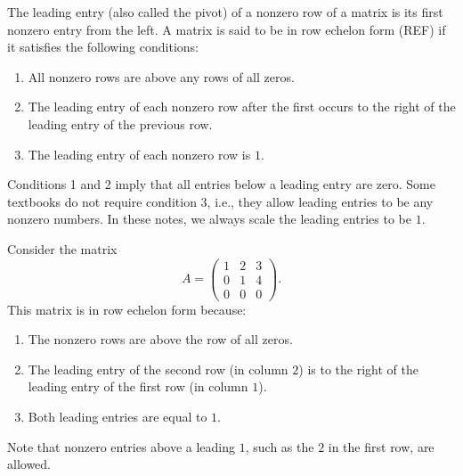\begin{definition}
    The leading entry (also called the pivot) of a nonzero row of a matrix is its first nonzero entry from the left. A matrix is said to be in row echelon form (REF) if it satisfies the following conditions:
    \begin{enumerate}
        \item All nonzero rows are above any rows of all zeros.
        \item The leading entry of each nonzero row after the first occurs to the right of the leading entry of the previous row.
        \item The leading entry of each nonzero row is $1$.
    \end{enumerate}
\end{definition}

\begin{remark}
    Conditions 1 and 2 imply that all entries below a leading entry are zero. Some textbooks do not require condition 3, i.e., they allow leading entries to be any nonzero numbers. In these notes, we always scale the leading entries to be $1$.
\end{remark}

\begin{example}\label{L1-ex:refA}
    Consider the matrix
    \[A = \begin{pmatrix}
        1 & 2 & 3 \\
        0 & 1 & 4 \\
        0 & 0 & 0
    \end{pmatrix}.\]
    This matrix is in row echelon form because:
    \begin{enumerate}
        \item The nonzero rows are above the row of all zeros.
        \item The leading entry of the second row (in column $2$) is to the right of the leading entry of the first row (in column $1$).
        \item Both leading entries are equal to $1$.
    \end{enumerate}
    Note that nonzero entries above a leading $1$, such as the $2$ in the first row, are allowed.
\end{example}


